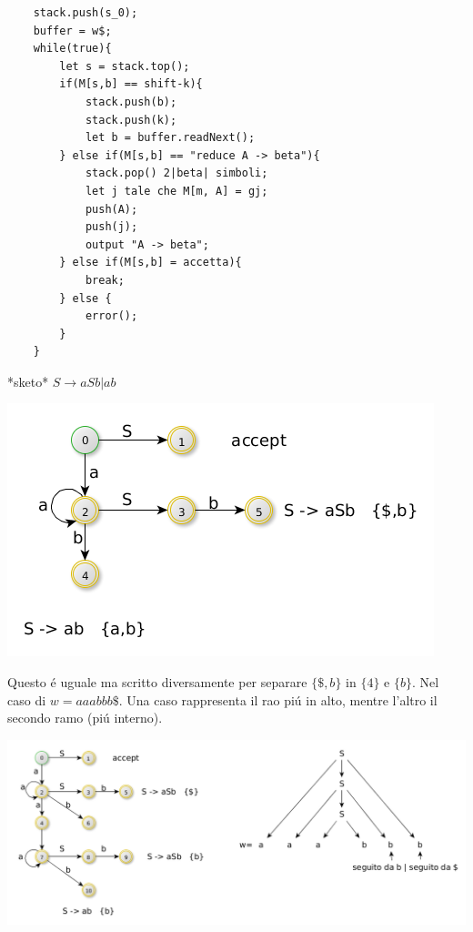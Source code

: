 \begin{lstlisting}
    stack.push(s_0);
    buffer = w$;
    while(true){
        let s = stack.top();
        if(M[s,b] == shift-k){
            stack.push(b);
            stack.push(k);
            let b = buffer.readNext(); 
        } else if(M[s,b] == "reduce A -> beta"){
            stack.pop() 2|beta| simboli;
            let j tale che M[m, A] = gj;
            push(A);
            push(j);
            output "A -> beta";
        } else if(M[s,b] = accetta){
            break;
        } else {
            error();
        }
    }
\end{lstlisting}

*sketo*
$S \rightarrow aSb | ab $

\begin{center}
    \includegraphics[scale=0.6]{Chapters/Img/c02_15.png}\\
\end{center} 

Questo \'e uguale ma scritto diversamente per separare $\{ \$, b\}$ in $\{4\}$ e $\{b\}$. Nel caso di $w=aaabbb\$$. Una caso rappresenta
il rao pi\'u in alto, mentre l'altro il secondo ramo (pi\'u interno).

\begin{center}
    \includegraphics[scale=0.45]{Chapters/Img/c02_16.png}\\
\end{center} 


